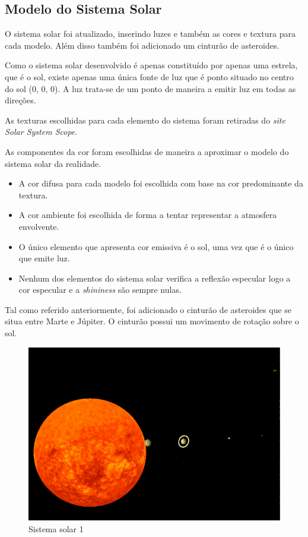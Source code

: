 \documentclass[relatorio.tex]{subfiles}
\begin{document}
    
\subsection{Modelo do Sistema Solar} \label{subsec:sistema_solar}

O sistema solar foi atualizado, inserindo luzes e também as cores
e textura para cada modelo. Além disso também foi adicionado um 
cinturão de asteroides.

Como o sistema solar desenvolvido é apenas constituído por apenas uma estrela, que é
o sol, existe apenas uma única fonte de luz que é ponto situado no centro do sol (0, 0, 0). A 
luz trata-se de um ponto de maneira a emitir luz em todas as direções.

As texturas escolhidas para cada elemento do sistema foram retiradas do \textit{site Solar System Scope}.

As componentes da cor foram escolhidas de maneira a aproximar o modelo do sistema solar da realidade. 
\begin{itemize}
    \item A cor difusa para cada modelo foi escolhida com base na cor predominante da textura.
    \item A cor ambiente foi escolhida de forma a tentar representar a atmosfera envolvente.
    \item O único elemento que apresenta cor emissiva é o sol, uma vez que é o único que emite luz.
    \item Nenhum dos elementos do sistema solar verifica a reflexão especular logo a cor especular
    e a \textit{shininess} são sempre nulas.
\end{itemize}

Tal como referido anteriormente, foi adicionado o cinturão de asteroides que se situa entre Marte e 
Júpiter. O cinturão possui um movimento de rotação sobre o sol.

\begin{landscape}
    \begin{figure}
        \centering
        \includegraphics[width=\linewidth]{assets/sis_solar1.png}
        \caption{Sistema solar 1} \label{fig:sistema_solar_1}
    \end{figure}
\end{landscape}
\end{document}
